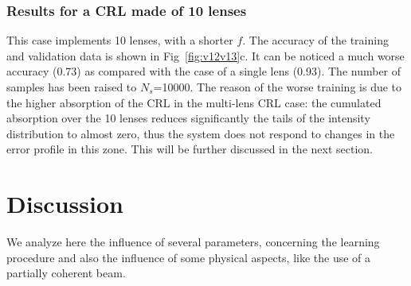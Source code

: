 \documentclass[preprint]{iucr}
\newcommand{\todo}[1]{{\color{red}[TODO: "#1'']}}
\newcommand{\inred}[1]{{\color{red}#1}}
\begin{document}

 

    




 \subsubsection{Results for a CRL made of 10 lenses}
 This case implements 10 lenses, with a shorter $f$. The accuracy of the training and validation data is shown in 
 Fig~\ref{fig:v12v13}c.
 It can be noticed a much worse accuracy (0.73) as compared with the case of a single lens (0.93). The number of samples has been raised to $N_s$=10000. The reason of the worse training is due to the higher absorption of the CRL in the multi-lens CRL case: the cumulated absorption over the 10 lenses reduces significantly the tails of the intensity distribution to almost zero, thus the system does not respond to changes in the error profile in this zone. This will be further discussed in the next section.



\section{Discussion}\label{sec:discussion}

We analyze here the influence of several parameters, concerning the learning procedure and also the influence of some physical aspects, like the use of a partially coherent beam.

\end{document}
